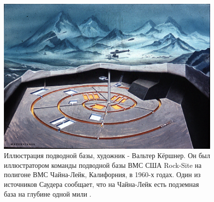 \documentclass[10pt,twocolumn,letterpaper]{article}
\begin{document}
\begin{figure}[t]
\begin{center}
   \includegraphics[width=1\linewidth]{undersea.jpg}
\end{center}
   \caption{Иллюстрация подводной базы, художник - Вальтер Кёршнер. Он был иллюстратором команды подводной базы ВМС США Rock-Site на полигоне ВМС Чайна-Лейк, Калифорния, в 1960-х годах. Один из источников Саудера сообщает, что на Чайна-Лейк есть подземная база на глубине одной мили \cite{22,23}.}
\label{fig:5}
\label{fig:onecol}
\end{figure}
\end{document}
